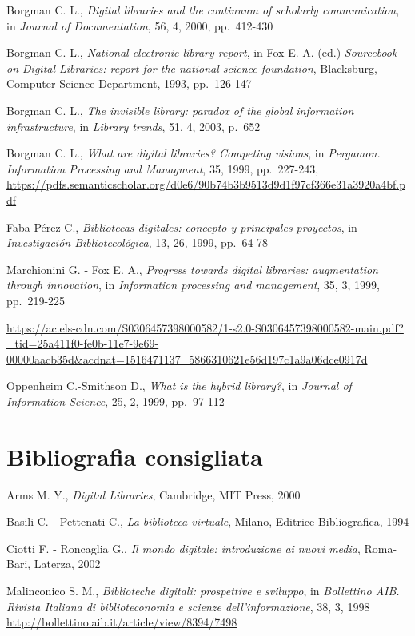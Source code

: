\documentclass[
  b5paper,
  twoside,
  12pt,
  chapterprefix=false,
  bibliography=totocnumbered,
  parskip=false]{scrbook}
\begin{document}
Borgman C. L., \emph{Digital libraries and the continuum of scholarly
communication}, in \emph{Journal of Documentation}, 56, 4, 2000, pp.~412-430

Borgman C. L., \emph{National electronic library report}, in Fox E. A. (ed.)
\emph{Sourcebook on Digital Libraries: report for the national science
foundation}, Blacksburg, Computer Science Department, 1993, pp.~126-147

Borgman C. L., \emph{The invisible library: paradox of the global information
infrastructure}, in \emph{Library trends}, 51, 4, 2003, p.~652

Borgman C. L., \emph{What are digital libraries? Competing visions}, in
\emph{Pergamon. Information Processing and Managment}, 35, 1999, pp.~227-243,
\url{https://pdfs.semanticscholar.org/d0e6/90b74b3b9513d9d1f97cf366e31a3920a4bf.pdf}

Faba Pérez C., \emph{Bibliotecas digitales: concepto y principales
proyectos}, in \emph{Investigación Bibliotecológica}, 13, 26, 1999, pp.~64-78

Marchionini G. - Fox E. A., \emph{Progress towards digital libraries:
augmentation through innovation}, in \emph{Information processing and
management}, 35, 3, 1999, pp.~219-225

\url{https://ac.els-cdn.com/S0306457398000582/1-s2.0-S0306457398000582-main.pdf?_tid=25a411f0-fe0b-11e7-9e69-00000aacb35d\&acdnat=1516471137_5866310621e56d197c1a9a06dce0917d}

Oppenheim C.-Smithson D., \emph{What is the hybrid library?}, in \emph{Journal of
Information Science}, 25, 2, 1999, pp.~97-112

\hypertarget{bibliografia-consigliata-1}{%
\section*{Bibliografia consigliata}\label{bibliografia-consigliata-1}}

Arms M. Y., \emph{Digital Libraries}, Cambridge, MIT Press, 2000

Basili C. - Pettenati C., \emph{La biblioteca virtuale}, Milano, Editrice
Bibliografica, 1994

Ciotti F. - Roncaglia G., \emph{Il mondo digitale: introduzione ai nuovi
media}, Roma-Bari, Laterza, 2002

Malinconico S. M., \emph{Biblioteche digitali: prospettive e sviluppo}, in
\emph{Bollettino AIB. Rivista Italiana di biblioteconomia e scienze
dell'informazione}, 38, 3, 1998
\url{http://bollettino.aib.it/article/view/8394/7498}
\end{document}

